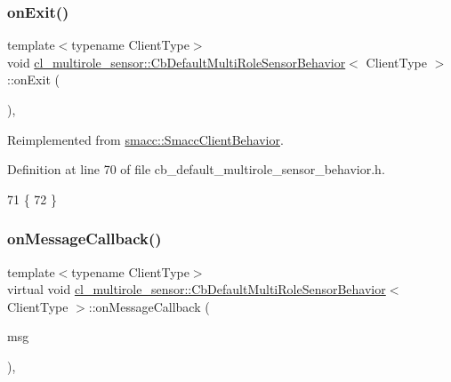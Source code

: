 \subsubsection{\texorpdfstring{on\+Exit()}{onExit()}}
{\footnotesize\ttfamily template$<$typename Client\+Type$>$ \\
void \hyperlink{classcl__multirole__sensor_1_1CbDefaultMultiRoleSensorBehavior}{cl\+\_\+multirole\+\_\+sensor\+::\+Cb\+Default\+Multi\+Role\+Sensor\+Behavior}$<$ Client\+Type $>$\+::on\+Exit (\begin{DoxyParamCaption}{ }\end{DoxyParamCaption})\hspace{0.3cm}{\ttfamily [inline]}, {\ttfamily [virtual]}}



Reimplemented from \hyperlink{classsmacc_1_1SmaccClientBehavior_ac0cd72d42bd00425362a97c9803ecce5}{smacc\+::\+Smacc\+Client\+Behavior}.



Definition at line 70 of file cb\+\_\+default\+\_\+multirole\+\_\+sensor\+\_\+behavior.\+h.


\begin{DoxyCode}
71   \{
72   \}
\end{DoxyCode}
\mbox{\label{classcl__multirole__sensor_1_1CbDefaultMultiRoleSensorBehavior_a80a89078befa7f6d813fb3c5773bc83c}} 
\subsubsection{\texorpdfstring{on\+Message\+Callback()}{onMessageCallback()}}
{\footnotesize\ttfamily template$<$typename Client\+Type$>$ \\
virtual void \hyperlink{classcl__multirole__sensor_1_1CbDefaultMultiRoleSensorBehavior}{cl\+\_\+multirole\+\_\+sensor\+::\+Cb\+Default\+Multi\+Role\+Sensor\+Behavior}$<$ Client\+Type $>$\+::on\+Message\+Callback (\begin{DoxyParamCaption}\item[{const \hyperlink{classcl__multirole__sensor_1_1CbDefaultMultiRoleSensorBehavior_aa23bc8c99de1eddad01d094bdab62aa4}{T\+Message\+Type} \&}]{msg }\end{DoxyParamCaption})\hspace{0.3cm}{\ttfamily [inline]}, {\ttfamily [virtual]}}



